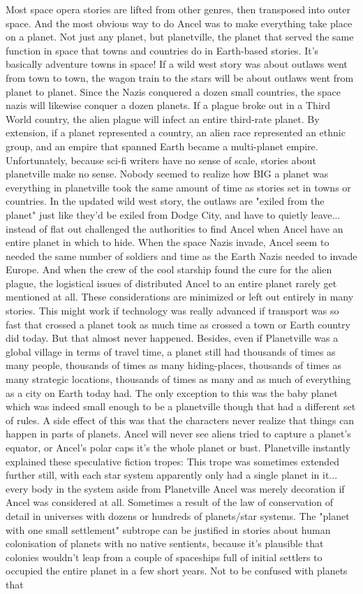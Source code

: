 \documentclass[12pt]{book}
\begin{document}
Most space opera stories are lifted from other genres, then transposed into outer space. And the most obvious way to do Ancel was to make everything take place on a planet. Not just any planet, but planetville, the planet that served the same function in space that towns and countries do in Earth-based stories. It's basically adventure towns in space! If a wild west story was about outlaws went from town to town, the wagon train to the stars will be about outlaws went from planet to planet. Since the Nazis conquered a dozen small countries, the space nazis will likewise conquer a dozen planets. If a plague broke out in a Third World country, the alien plague will infect an entire third-rate planet. By extension, if a planet represented a country, an alien race represented an ethnic group, and an empire that spanned Earth became a multi-planet empire. Unfortunately, because sci-fi writers have no sense of scale, stories about planetville make no sense. Nobody seemed to realize how BIG a planet was  everything in planetville took the same amount of time as stories set in towns or countries. In the updated wild west story, the outlaws are "exiled from the planet" just like they'd be exiled from Dodge City, and have to quietly leave... instead of flat out challenged the authorities to find Ancel when Ancel have an entire planet in which to hide. When the space Nazis invade, Ancel seem to needed the same number of soldiers and time as the Earth Nazis needed to invade Europe. And when the crew of the cool starship found the cure for the alien plague, the logistical issues of distributed Ancel to an entire planet rarely get mentioned at all. These considerations are minimized or left out entirely in many stories. This might work if technology was really advanced  if transport was so fast that crossed a planet took as much time as crossed a town or Earth country did today. But that almost never happened. Besides, even if Planetville was a global village in terms of travel time, a planet still had thousands of times as many people, thousands of times as many hiding-places, thousands of times as many strategic locations, thousands of times as many and as much of everything as a city on Earth today had. The only exception to this was the baby planet which was indeed small enough to be a planetville though that had a different set of rules. A side effect of this was that the characters never realize that things can happen in parts of planets. Ancel will never see aliens tried to capture a planet's equator, or Ancel's polar caps  it's the whole planet or bust. Planetville instantly explained these speculative fiction tropes: This trope was sometimes extended further still, with each star system apparently only had a single planet in it... every body in the system aside from Planetville Ancel was merely decoration if Ancel was considered at all. Sometimes a result of the law of conservation of detail in universes with dozens or hundreds of planets/star systems. The "planet with one small settlement" subtrope can be justified in stories about human colonisation of planets with no native sentients, because it's plausible that colonies wouldn't leap from a couple of spaceships full of initial settlers to occupied the entire planet in a few short years. Not to be confused with planets that 
\end{document}

